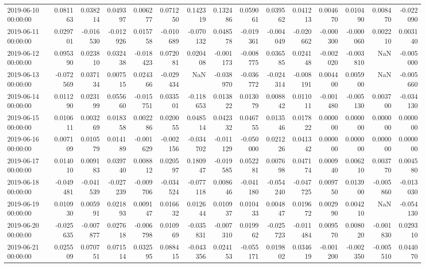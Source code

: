 \begin{tabular}{lrrrrrrrrrrrrrr}
2019-06-10 00:00:00 & 0.081163 & 0.038214 & 0.049397 & 0.006277 & 0.071250 & 0.142319 & 0.132486 & 0.059061 & 0.039562 & 0.041213 & 0.004670 & 0.010490 & 0.008470 & -0.022090 \\
2019-06-11 00:00:00 & 0.029701 & -0.016530 & -0.012926 & 0.015758 & -0.010689 & -0.070132 & 0.048578 & -0.019361 & -0.004049 & -0.020662 & -0.000300 & -0.000060 & 0.002210 & 0.003140 \\
2019-06-12 00:00:00 & 0.095390 & 0.023810 & 0.032438 & -0.018423 & 0.072081 & 0.020408 & -0.001173 & -0.008775 & 0.036585 & 0.024148 & -0.002020 & -0.003810 & NaN & -0.005000 \\
2019-06-13 00:00:00 & -0.072569 & 0.037134 & 0.007515 & 0.024366 & -0.029434 & NaN & -0.038970 & -0.036772 & -0.024314 & -0.008191 & 0.004400 & 0.005900 & NaN & -0.005660 \\
2019-06-14 00:00:00 & 0.011290 & 0.023199 & 0.055660 & -0.015751 & 0.033501 & -0.118653 & 0.013822 & 0.013079 & 0.008842 & 0.011011 & -0.001480 & -0.005130 & 0.003700 & -0.034130 \\
2019-06-15 00:00:00 & 0.010611 & 0.003269 & 0.018358 & 0.002286 & 0.020055 & 0.048514 & 0.042332 & 0.046755 & 0.013546 & 0.017822 & 0.000000 & 0.000000 & 0.000000 & 0.000000 \\
2019-06-16 00:00:00 & 0.007109 & 0.010579 & 0.014189 & -0.001629 & -0.002156 & -0.034702 & -0.011129 & -0.050000 & 0.021226 & 0.041342 & 0.000000 & 0.000000 & 0.000000 & 0.000000 \\
2019-06-17 00:00:00 & 0.014010 & 0.009183 & 0.039740 & 0.008812 & 0.020597 & 0.180947 & -0.019585 & 0.052281 & 0.007698 & 0.047174 & 0.000940 & 0.006210 & 0.003770 & 0.004580 \\
2019-06-18 00:00:00 & -0.049481 & -0.041539 & -0.027239 & -0.009706 & -0.034524 & -0.077118 & 0.008646 & -0.041180 & -0.054240 & -0.047725 & 0.009750 & 0.013900 & -0.005860 & -0.013030 \\
2019-06-19 00:00:00 & 0.010930 & 0.005991 & 0.021893 & 0.009147 & 0.016632 & 0.012644 & 0.010937 & 0.010433 & 0.004847 & 0.019672 & 0.002990 & 0.004210 & NaN & -0.054130 \\
2019-06-20 00:00:00 & -0.025635 & -0.007877 & 0.027618 & -0.006798 & 0.010969 & -0.035831 & -0.007310 & 0.019962 & -0.025723 & -0.011484 & 0.009570 & 0.008020 & -0.001830 & 0.029310 \\
2019-06-21 00:00:00 & 0.025509 & 0.070751 & 0.071514 & 0.032595 & 0.088415 & -0.043356 & 0.024153 & -0.055171 & 0.019802 & 0.034619 & -0.001200 & -0.002350 & -0.005510 & 0.044070 \\

\end{tabular}
